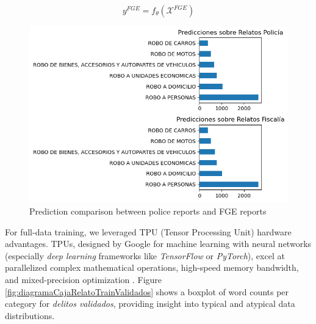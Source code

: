 \documentclass[onecolumn, journal, english, 12pt, a4paper]{IEEEtran} %
\theoremstyle{definition}
\begin{document}
\begin{equation}\label{eq:prediccionRelatoFGE}
    y^{FGE} = f_\theta(\mathbf{\mathcal{X}}^{FGE})
\end{equation}

\begin{figure}[h!]
    \centering
    \includegraphics[width=\textwidth]{imgs/prediccionDelitosSeguimientoPoliciaVsFiscalia.png}
    \caption{Prediction comparison between police reports and FGE reports}
    \label{fig:comparacionDelitosSeguimientoRelatos}
\end{figure}

For full-data training, we leveraged TPU (Tensor Processing Unit)
hardware advantages. TPUs, designed by Google for machine learning
with neural networks (especially \emph{deep learning} frameworks like
\emph{TensorFlow} or \emph{PyTorch}), excel at parallelized complex
mathematical operations, high-speed memory bandwidth, and
mixed-precision optimization
\cite{wang2019benchmarkingtpugpucpu}\cite{carrion2023explorationtpusaiapplications}. Figure
\ref{fig:diagramaCajaRelatoTrainValidados} shows a boxplot of word
counts per category for \emph{delitos validados}, providing insight
into typical and atypical data distributions.

\end{document}
